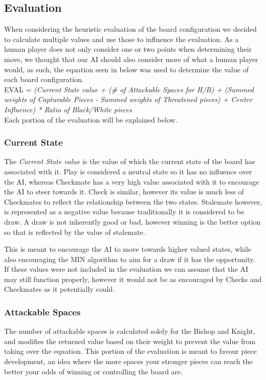 \documentclass[conference]{IEEEtran}
\begin{document}
\subsection{Evaluation}
When considering the heuristic evaluation of the board configuration we decided to calculate multiple values and use those to influence the evaluation. As a human player does not only consider one or two points when determining their move, we thought that our AI should also consider more of what a human player would, as such, the equation seen in below was used to determine the value of each board configuration. \\

EVAL = \textit{(Current State value + (\# of Attackable Spaces for H/B) + (Summed weights of Capturable Pieces - Summed weights of Threatened pieces) + Center Influence) * Ratio of Black/White pieces} \\

Each portion of the evaluation will be explained below.

\subsubsection{Current State}
The \textit{Current State value} is the value of which the current state of the board has associated with it. Play is considered a neutral state so it has no influence over the AI, whereas Checkmate has a very high value associated with it to encourage the AI to steer towards it. Check is similar, however its value is much less of Checkmates to reflect the relationship between the two states. Stalemate however, is represented as a negative value because traditionally it is considered to be draw. A draw is not inherently good or bad, however winning is the better option so that is reflected by the value of stalemate. 

This is meant to encourage the AI to move towards higher valued states, while also encouraging the MIN algorithm to aim for a draw if it has the opportunity. If these values were not included in the evaluation we can assume that the AI may still function properly, however it would not be as encouraged by Checks and Checkmates as it potentially could.

\subsubsection{Attackable Spaces}
The number of attackable spaces is calculated solely for the Bishop and Knight, and modifies the returned value based on their weight to prevent the value from taking over the equation. This portion of the evaluation is meant to favour piece development, an idea where the more spaces your stronger pieces can reach the better your odds of winning or controlling the board are. 
\end{document}

